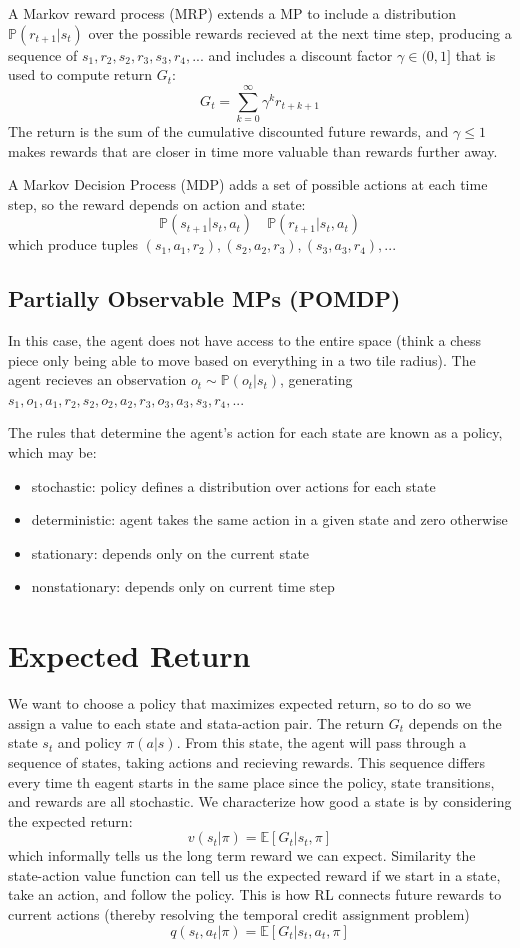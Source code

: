 \documentclass[11pt]{article}
\newcommand{\E}{\mathbb{E}}
\newcommand{\Pbb}{\mathbb{P}}
\begin{document}
A Markov reward process (MRP) extends a MP to include a distribution $\Pbb (r_{t+1}|s_t)$ over the possible rewards recieved at the next time step, producing a sequence of $s_1, r_2, s_2, r_3, s_3, r_4,...$ and includes a discount factor $\gamma \in (0,1]$ that is used to compute return $G_t$:
\[
G_t=\sum_{k=0}^{\infty} \gamma^k r_{t+k+1}
\]
The return is the sum of the cumulative discounted future rewards, and $\gamma \le 1$ makes rewards that are closer in time more valuable than rewards further away.

A Markov Decision Process (MDP) adds a set of possible actions at each time step, so the reward depends on action and state: 
\[
\Pbb (s_{t+1}|s_t, a_t) \quad \Pbb (r_{t+1}|s_t, a_t)
\]
which produce tuples $(s_1, a_1, r_2),(s_2, a_2, r_3),(s_3, a_3, r_4),...$
\subsection*{Partially Observable MPs (POMDP)}
In this case, the agent does not have access to the entire space (think a chess piece only being able to move based on everything in a two tile radius). The agent recieves an observation $o_t \sim \Pbb (o_t | s_t)$, generating $s_1, o_1, a_1, r_2, s_2, o_2, a_2, r_3, o_3, a_3, s_3, r_4, ...$

The rules that determine the agent's action for each state are known as a policy, which may be:
\begin{itemize}
    \item stochastic: policy defines a distribution over actions for each state
    \item deterministic: agent takes the same action in a given state and zero otherwise
    \item stationary: depends only on the current state
    \item nonstationary: depends only on current time step
\end{itemize}

\section{Expected Return}
We want to choose a policy that maximizes expected return, so to do so we assign a value to each state and stata-action pair. The return $G_t$ depends on the state $s_t$ and policy $\pi (a|s)$. From this state, the agent will pass through a sequence of states, taking actions and recieving rewards. This sequence differs every time th eagent starts in the same place since the policy, state transitions, and rewards are all stochastic. We characterize how good a state is by considering the expected return:
\[
v(s_t | \pi) = \E [G_t | s_t, \pi]
\]
which informally tells us the long term reward we can expect. Similarity the state-action value function can tell us the expected reward if we start in a state, take an action, and follow the policy. This is how RL connects future rewards to current actions (thereby resolving the temporal credit assignment problem)
\[
q(s_t , a_t| \pi) = \E [G_t | s_t, a_t, \pi]
\]
\end{document}
